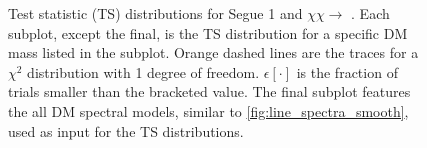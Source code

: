 \begin{figure}[!h]
    \caption{Test statistic (TS) distributions for Segue 1 and $\chi\chi \rightarrow$ . Each subplot, except the final, is the TS distribution for a specific DM mass listed in the subplot. Orange dashed lines are the traces for a $\chi^2$ distribution with 1 degree of freedom. $\epsilon[\cdot]$ is the fraction of trials smaller than the bracketed value. The final subplot features the all DM spectral models, similar to \cref{fig:line_spectra_smooth}, used as input for the TS distributions.}
    \label{fig:icDM_Seg1bb_TS}
\end{figure}

